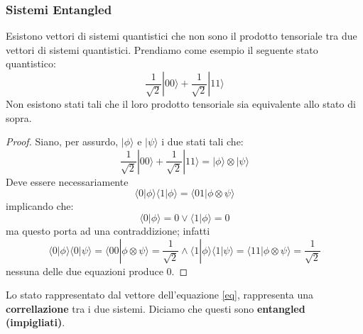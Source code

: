 \subsubsection{Sistemi Entangled}
Esistono vettori di sistemi quantistici che non sono il prodotto tensoriale tra due vettori di sistemi quantistici. Prendiamo come esempio il seguente stato quantistico:
\begin{equation}\label{eq}
    \frac{1}{\sqrt{2}}|00\rangle + \frac{1}{\sqrt{2}}|11\rangle
\end{equation}
Non esistono stati tali che il loro prodotto tensoriale sia equivalente allo stato di sopra.
\begin{proof}
    Siano, per assurdo, $|\phi\rangle$ e $|\psi\rangle$ i due stati tali che:
    \begin{equation*}
        \frac{1}{\sqrt{2}}|00\rangle + \frac{1}{\sqrt{2}}|11\rangle = |\phi\rangle \otimes |\psi\rangle
    \end{equation*}
    Deve essere necessariamente
    \begin{equation*}
        \langle 0 | \phi \rangle \langle 1 | \phi \rangle  = \langle 01 | \phi \otimes \psi \rangle 
    \end{equation*}
    implicando che:
    \begin{equation*}
        \langle 0 | \phi \rangle = 0 \vee \langle 1 | \phi \rangle = 0
    \end{equation*}
    ma questo porta ad una contraddizione; infatti
    \begin{equation*}
        \langle 0 | \phi \rangle \langle 0 | \psi \rangle = \langle 00 | \phi \otimes \psi \rangle = \frac{1}{\sqrt{2}} \wedge \langle 1 | \phi \rangle \langle 1 | \psi \rangle = \langle 11 | \phi \otimes \psi \rangle = \frac{1}{\sqrt{2}}
    \end{equation*}
    nessuna delle due equazioni produce $0$.   
\end{proof}
Lo stato rappresentato dal vettore dell'equazione \ref{eq}, rappresenta una \textbf{correllazione} tra i due sistemi. Diciamo che questi sono \textbf{entangled (impigliati)}.
